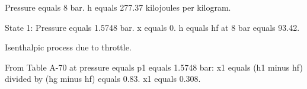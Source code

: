 Pressure equals 8 bar.  
h equals 277.37 kilojoules per kilogram.  

State 1:  
Pressure equals 1.5748 bar.  
x equals 0.  
h equals hf at 8 bar equals 93.42.  

Isenthalpic process due to throttle.  

From Table A-70 at pressure equals p1 equals 1.5748 bar:  
x1 equals (h1 minus hf) divided by (hg minus hf) equals 0.83.  
x1 equals 0.308.